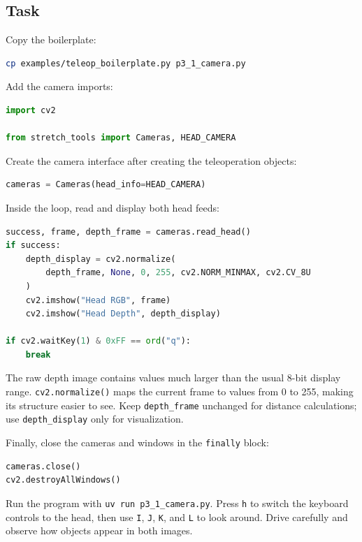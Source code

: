 \documentclass[11pt,a4paper]{article}
\begin{document}
\subsection*{Task}

Copy the boilerplate:

\begin{lstlisting}[language=bash]
cp examples/teleop_boilerplate.py p3_1_camera.py
\end{lstlisting}

Add the camera imports:

\begin{lstlisting}[language=Python]
import cv2

from stretch_tools import Cameras, HEAD_CAMERA
\end{lstlisting}

Create the camera interface after creating the teleoperation objects:

\begin{lstlisting}[language=Python]
cameras = Cameras(head_info=HEAD_CAMERA)
\end{lstlisting}

Inside the loop, read and display both head feeds:

\begin{lstlisting}[language=Python]
success, frame, depth_frame = cameras.read_head()
if success:
    depth_display = cv2.normalize(
        depth_frame, None, 0, 255, cv2.NORM_MINMAX, cv2.CV_8U
    )
    cv2.imshow("Head RGB", frame)
    cv2.imshow("Head Depth", depth_display)

if cv2.waitKey(1) & 0xFF == ord("q"):
    break
\end{lstlisting}

The raw depth image contains values much larger than the usual 8-bit display
range. \texttt{cv2.normalize()} maps the current frame to values from 0 to 255,
making its structure easier to see. Keep \texttt{depth\_frame} unchanged for
distance calculations; use \texttt{depth\_display} only for visualization.

Finally, close the cameras and windows in the \texttt{finally} block:

\begin{lstlisting}[language=Python]
cameras.close()
cv2.destroyAllWindows()
\end{lstlisting}

Run the program with \texttt{uv run p3\_1\_camera.py}. Press \texttt{h} to
switch the keyboard controls to the head, then use \texttt{I}, \texttt{J},
\texttt{K}, and \texttt{L} to look around. Drive carefully and observe how
objects appear in both images.
\end{document}
